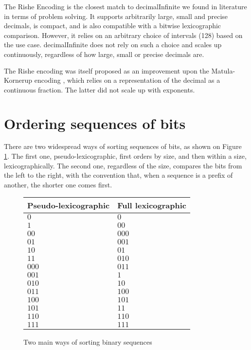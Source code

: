 \documentclass{acm_proc_article-sp}
\begin{document}
The Rishe Encoding \cite{Rishe1992} is the closest match to decimalInfinite we found in literature in terms of problem solving. It supports arbitrarily large, small and precise decimals, is compact, and is also compatible with a bitwise lexicographic comparison. However, it relies on an arbitrary choice of intervals (128) based on the use case. decimalInfinite does not rely on such a choice and scales up continuously, regardless of how large, small or precise decimals are.

The Rishe encoding was itself proposed as an improvement upon the Matula-Kornerup encoding \cite{Kornerup1983}, which relies on a representation of the decimal as a continuous fraction. The latter did not scale up with exponents.

\section{Ordering sequences of bits}

There are two widespread ways of sorting sequences of bits, as shown on Figure \ref{figure-orders}. The first one, pseudo-lexicographic, first orders by size, and then within a size, lexicographically. The second one, regardless of the size, compares the bits from the left to the right, with the convention that, when a sequence is a prefix of another, the shorter one comes first.

\begin{figure}
\caption{Two main ways of sorting binary sequences}
\label{figure-orders}
\center
\begin{tabular}{|l|l|}
\hline
Pseudo-lexicographic & Full lexicographic \\
\hline
$0$ & $0$ \\
$1$ & $00$ \\
$00$ & $000$ \\
$01$ & $001$ \\
$10$ & $01$ \\
$11$ & $010$ \\
$000$ & $011$ \\
$001$ & $1$ \\
$010$ & $10$ \\
$011$ & $100$ \\
$100$ & $101$ \\
$101$ & $11$ \\
$110$ & $110$ \\
$111$ & $111$ \\
\hline
\end{tabular}
\end{figure}
\end{document}
